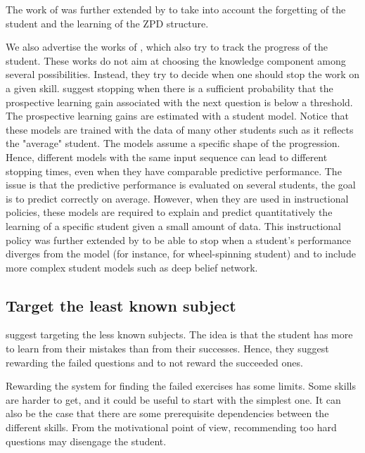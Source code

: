 The work of \citet{clement2015multi} was further extended by \citet{mu2018combining} to take into account the forgetting of the student and the learning of the ZPD structure. 

We also advertise the works of \citet{rollinson2015predictive, kaser2016stop}, which also try to track the progress of the student. These works do not aim at choosing the knowledge component among several possibilities. Instead, they try to decide when one should stop the work on a given skill. \citet{rollinson2015predictive} suggest stopping when there is a sufficient probability that the prospective learning gain associated with the next question is below a threshold. The prospective learning gains are estimated with a student model. Notice that these models are trained with the data of many other students such as it reflects the "average" student.  The models assume a specific shape of the progression. Hence, different models with the same input sequence can lead to different stopping times, even when they have comparable predictive performance. The issue is that the predictive performance is evaluated on several students, the goal is to predict correctly on average. However, when they are used in instructional policies, these models are required to explain and predict quantitatively the learning of a specific student given a small amount of data. This instructional policy was further extended by \citet{kaser2016stop} to be able to stop when a student's performance diverges from the model (for instance, for wheel-spinning student) and to include more complex student models such as deep belief network. 

\subsection{Target the least known subject}
\label{ss:less-known}
\citet{melesko2019computer} suggest targeting the less known subjects. The idea is that the student has more to learn from their mistakes than from their successes. Hence, they suggest rewarding the failed questions and to not reward the succeeded ones. 

Rewarding the system for finding the failed exercises has some limits. Some skills are harder to get, and it could be useful to start with the simplest one. It can also be the case that there are some prerequisite dependencies between the different skills. From the motivational point of view, recommending too hard questions may disengage the student. 

